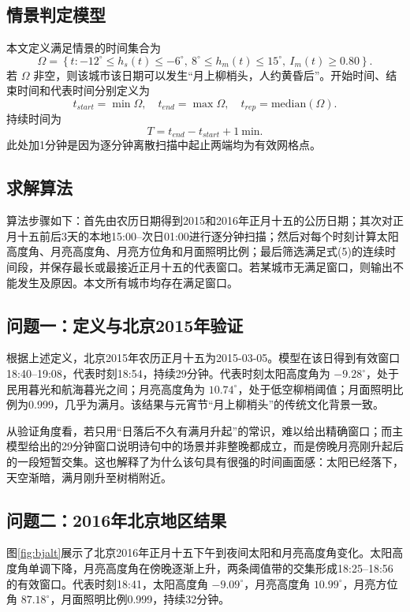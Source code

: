 \documentclass[UTF8,a4paper,12pt]{ctexart}
\begin{document}
\subsection{情景判定模型}
本文定义满足情景的时间集合为
\begin{equation}
\Omega=\left\{{t: -12^\circ\le h_s(t)\le -6^\circ,\ 8^\circ\le h_m(t)\le 15^\circ,\ I_m(t)\ge0.80}\right\} .
\end{equation}
若 $\Omega$ 非空，则该城市该日期可以发生“月上柳梢头，人约黄昏后”。开始时间、结束时间和代表时间分别定义为
\begin{equation}
t_{start}=\min \Omega,\quad t_{end}=\max \Omega,\quad t_{rep}=\mathrm{median}(\Omega).
\end{equation}
持续时间为
\begin{equation}
T=t_{end}-t_{start}+1\ \text{min} .
\end{equation}
此处加1分钟是因为逐分钟离散扫描中起止两端均为有效网格点。

\subsection{求解算法}
算法步骤如下：首先由农历日期得到2015和2016年正月十五的公历日期；其次对正月十五前后3天的本地15:00--次日01:00进行逐分钟扫描；然后对每个时刻计算太阳高度角、月亮高度角、月亮方位角和月面照明比例；最后筛选满足式(5)的连续时间段，并保存最长或最接近正月十五的代表窗口。若某城市无满足窗口，则输出不能发生及原因。本文所有城市均存在满足窗口。

\subsection{问题一：定义与北京2015年验证}
根据上述定义，北京2015年农历正月十五为2015-03-05。模型在该日得到有效窗口18:40--19:08，代表时刻18:54，持续29分钟。代表时刻太阳高度角为 $-9.28^\circ$，处于民用暮光和航海暮光之间；月亮高度角为 $10.74^\circ$，处于低空柳梢阈值；月面照明比例为0.999，几乎为满月。该结果与元宵节“月上柳梢头”的传统文化背景一致。

从验证角度看，若只用“日落后不久有满月升起”的常识，难以给出精确窗口；而主模型给出的29分钟窗口说明诗句中的场景并非整晚都成立，而是傍晚月亮刚升起后的一段短暂交集。这也解释了为什么该句具有很强的时间画面感：太阳已经落下，天空渐暗，满月刚升至树梢附近。

\subsection{问题二：2016年北京地区结果}
图\ref{fig:bjalt}展示了北京2016年正月十五下午到夜间太阳和月亮高度角变化。太阳高度角单调下降，月亮高度角在傍晚逐渐上升，两条阈值带的交集形成18:25--18:56的有效窗口。代表时刻18:41，太阳高度角 $-9.09^\circ$，月亮高度角 $10.99^\circ$，月亮方位角 $87.18^\circ$，月面照明比例0.999，持续32分钟。
\end{document}
